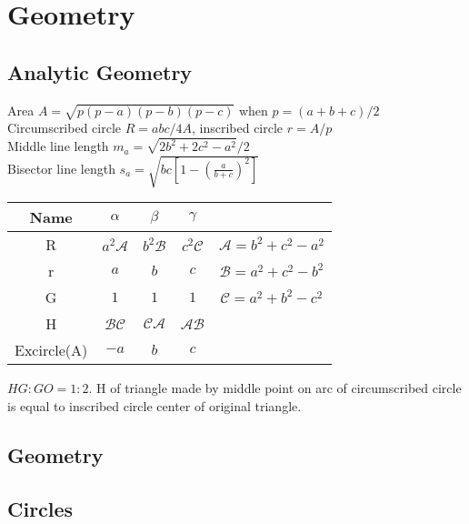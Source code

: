 \chapter{Geometry}

\section{Analytic Geometry}
Area $A = \sqrt{p(p-a)(p-b)(p-c)}$ when $p = (a+b+c)/2$ \\
Circumscribed circle $R = abc/4A$, inscribed circle $r = A/p$ \\ 
Middle line length $m_a = \sqrt{2b^2+2c^2-a^2}/2$ \\
Bisector line length $s_a=\sqrt{bc[1-(\frac{a}{b+c})^2]}$ \\
\begin{tabular}{|c|c|c|c|c|}
  Name & $\alpha$ & $\beta$ & $\gamma$ & \\ \hline
  R & $a^2\mathcal{A}$ & $b^2\mathcal{B}$ & $c^2\mathcal{C}$ & $\mathcal{A}=b^2+c^2-a^2$ \\
  r & $a$ & $b$ & $c$ & $\mathcal{B} = a^2 + c^2 - b^2$ \\
  G & $1$ & $1$ & $1$ & $\mathcal{C} = a^2 + b^2 - c^2$ \\
  H & $\mathcal{BC}$ & $\mathcal{CA}$ & $\mathcal{AB}$ & \\
  Excircle(A) & $-a$ & $b$ & $c$ & 
\end{tabular}
$HG:GO=1:2$. H of triangle made by middle point on arc of circumscribed circle is equal to inscribed circle center of original triangle. \\

\section{Geometry}

\section{Circles}

